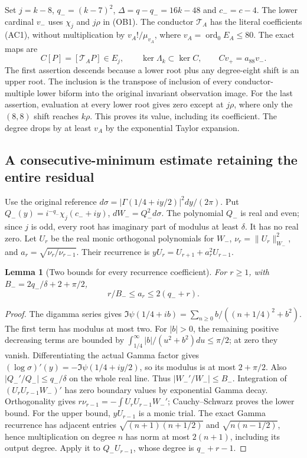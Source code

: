 \documentclass[11pt]{article}
\newtheorem{lemma}[theorem]{Lemma}
\theoremstyle{remark}\newtheorem{remark}[theorem]{Remark}
\begin{document}
Set $j=k-8$, $q_-=(k-7)^2$, $\Delta=q-q_-=16k-48$ and $c_-=c-4$.
The lower cardinal $v_-$ uses $\chi_j$ and $j\rho$ in (OB1).
The conductor $\mathcal T_A$ has the literal coefficients (AC1),
without multiplication by $v_A!/\mu_{v_A}$, where
$v_A=\operatorname{ord}_0E_A\le80$. The exact maps are
\[
 C[P]=[\mathcal T_AP]\in E_j,\qquad
 \ker\Lambda_k\subset\ker C,\qquad Cv_+=a_{88}v_- .\tag{OB3}
\]
The first assertion descends because a lower root plus any degree-eight
shift is an upper root. The inclusion is the transpose of inclusion
of every conductor-multiple lower biform into the original invariant
observation image. For the last assertion, evaluation at every lower
root gives zero except at $j\rho$, where only the $(8,8)$ shift
reaches $k\rho$. This proves its value, including its coefficient.
The degree drops by at least $v_A$ by the exponential Taylor expansion.

\subsection{A consecutive-minimum estimate retaining the entire residual}
Use the original reference $d\sigma=|\Gamma(1/4+iy/2)|^2dy/(2\pi)$.
Put $Q_-(y)=i^{-q_-}\chi_j(c_-+iy)$, $dW_-=Q_-^2d\sigma$.
The polynomial $Q_-$ is real and even; since $j$ is odd, every root
has imaginary part of modulus at least $\delta$. It has no real zero.
Let $U_r$ be the real monic orthogonal polynomials for $W_-$,
$\nu_r=\|U_r\|_{W_-}^2$, and $a_r=\sqrt{\nu_r/\nu_{r-1}}$.
Their recurrence is $yU_r=U_{r+1}+a_r^2U_{r-1}$.

\begin{lemma}[Two bounds for every recurrence coefficient]
For $r\ge1$, with $B_-=2q_-/\delta+2+\pi/2$,
\[
 r/B_-\le a_r\le2(q_-+r).\tag{OB4}
\]
\end{lemma}
\begin{proof}
The digamma series \cite[5.7.6]{DLMF5} gives
$\Im\psi(1/4+ib)=\sum_{n\ge0}b/((n+1/4)^2+b^2)$.
The first term has modulus at most two. For $|b|>0$, the remaining
positive decreasing terms are bounded by
$\int_{1/4}^\infty |b|/(u^2+b^2)du\le\pi/2$; at zero they vanish.
Differentiating the actual Gamma factor gives
$(\log\sigma)'(y)=-\Im\psi(1/4+iy/2)$, so its modulus is at most
$2+\pi/2$. Also $|Q_-'/Q_-|\le q_-/\delta$ on the whole real line.
Thus $|W_-'/W_-|\le B_-$. Integration of
$(U_rU_{r-1}W_-)'$ has zero boundary values by exponential Gamma
decay. Orthogonality gives
$r\nu_{r-1}=-\int U_rU_{r-1}W_-'$; Cauchy--Schwarz proves the
lower bound. For the upper bound, $yU_{r-1}$ is a monic trial.
The exact Gamma recurrence has adjacent entries
$\sqrt{(n+1)(n+1/2)}$ and $\sqrt{n(n-1/2)}$, hence multiplication
on degree $n$ has norm at most $2(n+1)$, including its output degree.
Apply it to $Q_-U_{r-1}$, whose degree is $q_-+r-1$.
\end{proof}
\end{document}
